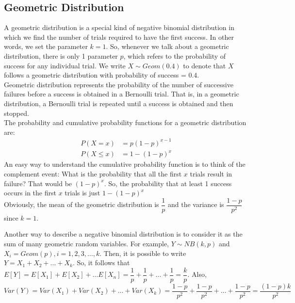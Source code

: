 \subsection{Geometric Distribution}
A geometric distribution is a special kind of negative binomial distribution in which we find the number of trials required to have the first success. In other words, we set the parameter $k = 1$. So, whenever we talk about a geometric distribution, there is only 1 parameter $p$, which refers to the probability of success for any individual trial. We write $X \sim Geom(0.4)$ to denote that $X$ follows a geometric distribution with probability of success = 0.4. \\
Geometric distribution represents the probability of the number of successive failures before a success is obtained in a Bernoulli trial. That is, in a geometric distribution, a Bernoulli trial is repeated until a success is obtained and then stopped. \\
The probability and cumulative probability functions for a geometric distribution are:
\begin{equation*}
    \begin{split}
        P(X = x) &= p(1-p)^{x-1} \\
        P(X \leq x) &= 1 - (1-p)^x
    \end{split}
\end{equation*}
An easy way to understand the cumulative probability function is to think of the complement event: What is the probability that all the first $x$ trials result in failure? That would be $(1-p)^x$. So, the probability that at least 1 success occurs in the first $x$ trials is just $1 - (1-p)^x$ \\
Obviously, the mean of the geometric distribution is $\dfrac{1}{p}$ and the variance is $\dfrac{1-p}{p^2}$ since $k = 1$.
\begin{note}
\end{note}
Another way to describe a negative binomial distribution is to consider it as the sum of many geometric random variables. For example, $Y \sim NB(k,p)$ and $X_i = Geom(p), i = 1,2,3,\dots, k$. Then, it is possible to write $Y = X_1 + X_2 + \dots + X_k$. So, it follows that $E[Y] = E[X_1] + E[X_2] + \dots E[X_n] = \dfrac{1}{p} + \dfrac{1}{p} + \dots + \dfrac{1}{p} = \dfrac{k}{p}$. Also, $Var(Y) = Var(X_1) + Var(X_2) + \dots + Var(X_k) = \dfrac{1-p}{p^2} + \dfrac{1-p}{p^2} + \dots + \dfrac{1-p}{p^2} = \dfrac{(1-p)k}{p^2}$ 
